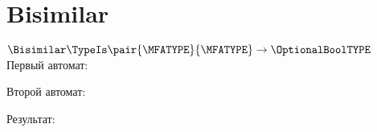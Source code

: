 \section{Bisimilar}
\begin{frame}{$\Bisimilar\TypeIs\pair{\MFATYPE}{\MFATYPE}\to\OptionalBoolTYPE$}
	Первый автомат:

	Второй автомат:

	Результат:

\end{frame}